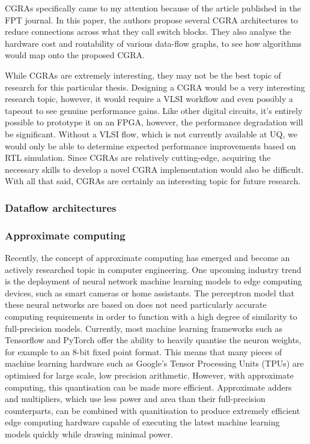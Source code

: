 \documentclass[12pt]{article}
\begin{document}
CGRAs specifically came to my attention because of the article \cite{Boma2022} published in the FPT journal.
In this paper, the authors propose several CGRA architectures to reduce connections across what they call
switch blocks. They also analyse the hardware cost and routability of various data-flow graphs, to see how
algorithms would map onto the proposed CGRA. 

While CGRAs are extremely interesting, they may not be the best topic of research for this particular thesis.
Designing a CGRA would be a very interesting research topic, however, it would require a VLSI workflow and even
possibly a tapeout to see genuine performance gains. Like other digital circuits, it's entirely possible to
prototype it on an FPGA, however, the performance degradation will be significant. Without a VLSI flow, which
is not currently available at UQ, we would only be able to determine expected performance improvements based
on RTL simulation. Since CGRAs are relatively cutting-edge, acquiring the necessary skills to develop a novel
CGRA implementation would also be difficult. With all that said, CGRAs are certainly an interesting topic for
future research.

\subsubsection{Dataflow architectures}

\subsubsection{Approximate computing}
%

Recently, the concept of approximate computing has emerged and become an actively researched topic in computer
engineering. One upcoming industry trend is the deployment of neural network machine learning models to edge
computing devices, such as smart cameras or home assistants. The perceptron model that these neural networks
are based on does not need particularly accurate computing requirements in order to function with a high
degree of similarity to full-precision models. Currently, most machine learning frameworks such as Tensorflow
and PyTorch offer the ability to heavily quantise the neuron weights, for example to an 8-bit fixed point
format. This means that many pieces of machine learning hardware such as Google's Tensor Processing Units
(TPUs) are optimised for large scale, low precision arithmetic. However, with approximate computing, this
quantisation can be made more efficient. Approximate adders and multipliers, which use less power and area
than their full-precision counterparts, can be combined with quanitisation to produce extremely efficient edge
computing hardware capable of executing the latest machine learning models quickly while drawing minimal
power.
\end{document}
